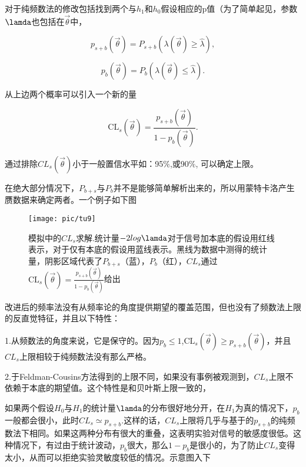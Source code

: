 对于纯频数法的修改包括找到两个与$h_{1}$和$h_{0}$假设相应的p值（为了简单起见，参数$\lamda$也包括在$\vec{\theta}$中，

\begin{equation}\label{key}
p_{s+b}(\vec{\theta }) = P_{s+b}(\lambda (\vec{\theta }) \geq \hat{\lambda }),
\end{equation}

\begin{equation}\label{key}
p_{b}(\vec{\theta }) = P_{b}(\lambda (\vec{\theta }) \leq \hat{\lambda }).
\end{equation}

从上边两个概率可以引入一个新的量

\begin{equation}\label{key}
\mathrm{CL}_{s}(\vec{\theta }) = \frac{p_{s+b}(\vec{\theta })} {1-p_{b}(\vec{\theta })}.
\end{equation}

通过排除$CL_{s}(\vec{\theta})$小于一般置信水平如：95$\%$,或90$\%$, 可以确定上限。

在绝大部分情况下，$P_{b+s}$与$P_{b}$并不是能够简单解析出来的，所以用蒙特卡洛产生赝数据来确定两者。一个例子如下图

\begin{figure}[ht]
	\centering
	\texttt{[image: pic/tu9]}
	\caption{模拟中的$CL_{s}$求解.统计量$-2log\lamda$对于信号加本底的假设用红线表示，对于仅有本底的假设用蓝线表示。黑线为数据中测得的统计量，阴影区域代表了$P_{b+s}$（蓝），$P_{b}$（红），$CL_{s}$通过$\mathrm{CL}_{s}(\vec{\theta }) = \frac{p_{s+b}(\vec{\theta })} {1-p_{b}(\vec{\theta })}$给出}
	\label{fig:9}
\end{figure}

改进后的频率法没有从频率论的角度提供期望的覆盖范围，但也没有了频数法上限的反直觉特征，并且以下特性：

1.从频数法的角度来说，它是保守的。因为$p_{b}\leq 1$,$\mathrm{CL}_{s}(\vec{\theta }) \geq p_{s+b}(\vec{\theta })$，并且${CL}_{s}$上限相较于纯频数法没有那么严格。

2.于Feldman-Cousins方法得到的上限不同，如果没有事例被观测到，$CL_{s}$上限不依赖于本底的期望值。这个特性是和贝叶斯上限一致的，

如果两个假设$H_{0}$与$H_{1}$的统计量$\lamda$的分布很好地分开，在$H_{1}$为真的情况下，$p_{b}$一般都会很小，此时$CL_{s}\simeq p_{s+b}$.这样的话，${CL}_{s}$上限将几乎与基于的$p_{s+b}$的纯频数法下相同。如果这两种分布有很大的重叠，这表明实验对信号的敏感度很低。这种情况下，有过由于统计波动，$p_{b}$很大，那么$1-p_{b}$是很小的，为了防止${CL}_{s}$变得太小，从而可以拒绝实验灵敏度较低的情况。示意图入下

